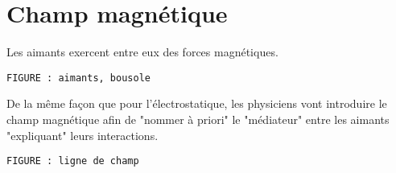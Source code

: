 
\section{Champ magnétique}
%
Les aimants exercent entre eux des forces magnétiques.

\begin{center}
%
\texttt{FIGURE : aimants, bousole}
\end{center}

De la même façon que pour l'électrostatique, les physiciens vont introduire le champ magnétique afin de "nommer à priori" le "médiateur" entre les aimants "expliquant" leurs interactions.

\begin{center}
%
\texttt{FIGURE : ligne de champ}
\end{center}
